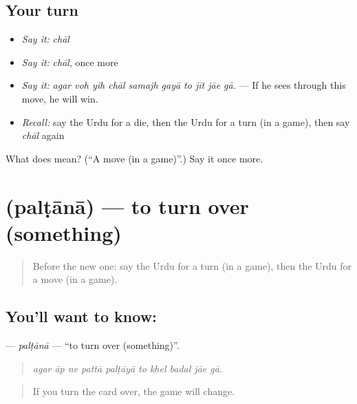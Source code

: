 \subsection*{Your turn}
\begin{itemize}
\raggedright
  \item \emph{Say it:} \emph{chāl}
  \item \emph{Say it:} \emph{chāl}, once more
  \item \emph{Say it:} \emph{agar voh yih chāl samajh gayā to jīt jāe gā.} — If he sees through this move, he will win.
  \item \emph{Recall:} say the Urdu for a die, then the Urdu for a turn (in a game), then say \emph{chāl} again
\end{itemize}

\begin{tcolorbox}[breakable,colback=teal!4,colframe=teal!35!black,title={Before you move on}]
What does  mean? (\textquotedblleft{}A move (in a game)\textquotedblright{}.) Say it once more.
\end{tcolorbox}
\section[\texorpdfstring{\ur{پلٹانا} (palṭānā)}{پلٹانا (palṭānā)}]{ (palṭānā) — to turn over (something)}

\label{lesson:UR-C533-paltana}



\begin{quote}
Before the new one: say the Urdu for a turn (in a game), then the Urdu for a move (in a game).
\end{quote}

\subsection*{You'll want to know: }
\textbf{} — \emph{palṭānā} — \textquotedblleft{}to turn over (something)\textquotedblright{}.

\begin{quote}
         
\end{quote}

\begin{quote}
\emph{agar āp ne pattā palṭāyā to khel badal jāe gā.}
\end{quote}

\begin{quote}
If you turn the card over, the game will change.
\end{quote}

